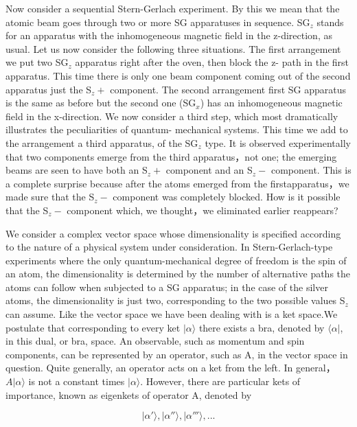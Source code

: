 \documentclass[a4paper]{article}
\newcommand{\ket}[1]{\big|  #1 \big \rangle }
\newcommand{\bra}[1]{ \big\langle #1 \big | }
\begin{document}
Now consider a sequential Stern-Gerlach experiment. By this we mean that the atomic beam goes through two or more SG apparatuses in sequence. SG$_z$ stands for an apparatus with the inhomogeneous magnetic field in the z-direction, as usual. Let us now consider the following three situations. The first arrangement we put two SG$_z$ apparatus right after the oven, then block the z- path in the first apparatus. This time there is only one beam component coming out of the second apparatus just the S$_z+$ component. The second arrangement first SG apparatus is the same as before but the second one (SG$_x$) has an inhomogeneous magnetic field in the x-direction. We now consider a third step, which most dramatically illustrates the peculiarities of quantum- mechanical systems. This time we add to the arrangement a third apparatus, of the SG$_z$ type. It is observed experimentally that two components emerge from the third apparatus，not one; the emerging beams are seen to have both an S$_z+$ component and an S$_z-$ component. This is a complete surprise because after the atoms emerged from the firstapparatus，we made sure that the S$_z-$ component was completely blocked. How is it possible that the S$_z-$ component which, we thought，we eliminated earlier reappears?

We consider a complex vector space whose dimensionality is specified according to the nature of a physical system under consideration. In Stern-Gerlach-type experiments where the only quantum-mechanical de­gree of freedom is the spin of an atom, the dimensionality is determined by the number of alternative paths the atoms can follow when subjected to a SG apparatus; in the case of the silver atoms, the dimensionality is just two, corresponding to the two possible values S$_z$ can assume. Like the vector space we have been dealing with is a ket space.We postulate that corresponding to every ket $\ket{\alpha}$ there exists a bra, denoted by $\bra{\alpha}$, in this dual, or bra, space. An observable, such as momentum and spin components, can be represented by an operator, such as A, in the vector space in question. Quite generally, an operator acts on a ket from the left. In general， $A \ket{\alpha}$ is not a constant times $\ket{\alpha}$. However, there are particular kets of importance, known as eigenkets of operator A, denoted by

\begin{equation}
\ket{\alpha'}  , \ket{\alpha''} , \ket{\alpha'''} , ...
\end{equation}
\end{document}
